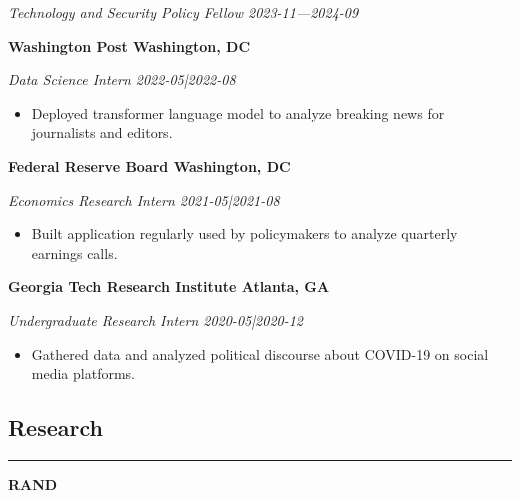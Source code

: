 \documentclass{article}
\newcommand{\headingOne}[1]{
    \subsection*{#1} \hrule
    \vspace*{6pt}
}
\newcommand{\headingTwo}[2]{
    \vspace*{6pt}
    \textbf{#1 \hfill #2}
}
\newcommand{\headingThree}[2]{
    \vspace*{2pt}
    \textsl{#1 \hfill #2}
}
\begin{document}
\headingThree{Technology and Security Policy Fellow}{2023-11—2024-09}


\headingTwo{Washington Post}{Washington, DC}

\headingThree{Data Science Intern}{2022-05|2022-08}
\begin{itemize}
    \item Deployed transformer language model to analyze breaking news for journalists and editors.
\end{itemize}


\headingTwo{Federal Reserve Board}{Washington, DC}

\headingThree{Economics Research Intern}{2021-05|2021-08}
\begin{itemize}
    \item Built application regularly used by policymakers to analyze quarterly earnings calls.
\end{itemize}


\headingTwo{Georgia Tech Research Institute}{Atlanta, GA}

\headingThree{Undergraduate Research Intern}{2020-05|2020-12}
\begin{itemize}
    \item Gathered data and analyzed political discourse about COVID-19 on social media platforms.
\end{itemize}


\headingOne{Research}

\headingTwo{RAND}{}
\end{document}
